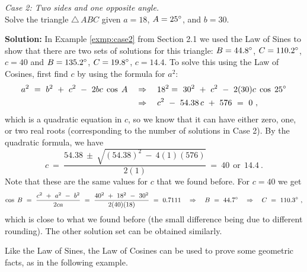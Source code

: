 \begin{exmp}\label{exmp:case2cosine}
 \emph{Case 2: Two sides and one opposite angle.}\\Solve the triangle $\triangle\,ABC$ given
 $a = 18$, $A = 25^\circ$, and $b = 30$.\vspace{1mm}
 \par\noindent\textbf{Solution:} In Example \ref{exmp:case2} from Section 2.1 we used the Law of Sines
 to show that there are
 two sets of solutions for this triangle: $B = 44.8^\circ$, $C = 110.2^\circ$, $c = 40$ and
 $B = 135.2^\circ$, $C = 19.8^\circ$, $c = 14.4$. To solve this using the Law of Cosines, first
 find $c$ by using the formula for $a^2$:
 \begin{align*}
  a^2 ~ = ~ b^2 ~ + ~ c^2 ~ - ~ 2bc\;\cos\;A \quad&\Rightarrow\quad
  18^2 = ~ 30^2 ~ + ~ c^2 ~ - ~ 2(30)c\;\cos\;25^\circ\\
  &\Rightarrow\quad c^2 ~-~ 54.38\,c ~+~ 576 ~ = ~ 0 ~,
 \end{align*}
 which is a quadratic equation in $c$, so we know that it can have either zero, one, or two real
 roots (corresponding to the number of solutions in Case 2). By the quadratic formula, we have
 \begin{displaymath}
  c ~=~ \frac{54.38 ~\pm~ \sqrt{(54.38)^2 ~-~ 4(1)(576)}}{2(1)} ~=~ 40 ~~\text{or}~~ 14.4 ~.
 \end{displaymath}
 Note that these are the same values for $c$ that we found before. For $c=40$ we get
 \begin{displaymath}
  \cos\;B ~=~ \frac{c^2 ~ + ~ a^2 ~-~ b^2}{2ca} ~=~
  \frac{40^2 ~ + ~ 18^2 ~-~ 30^2}{2(40)(18)} ~=~ 0.7111
  \quad\Rightarrow\quad B ~=~ 44.7^\circ \quad\Rightarrow\quad C ~=~ 110.3^\circ ~,
 \end{displaymath}
 which is close to what we found before (the small difference being due to different rounding). The
 other solution set can be obtained similarly.
\end{exmp}\vspace{-3mm}
\divider

Like the Law of Sines, the Law of Cosines can be used to prove some geometric facts, as in the
following example.\vspace{-1mm}

